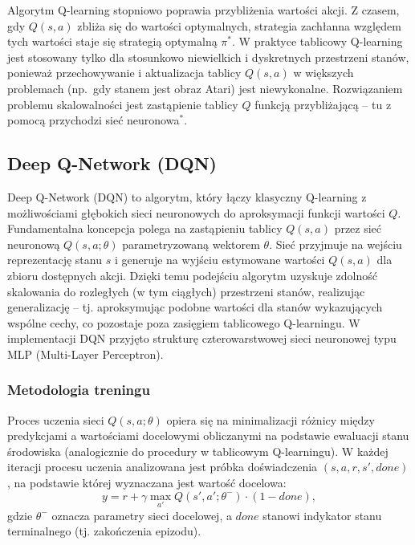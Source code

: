 \documentclass[a4paper,12pt]{article}
\begin{document}
Algorytm Q-learning stopniowo poprawia przybliżenia wartości akcji. Z czasem, gdy \(Q(s,a)\) zbliża się do wartości optymalnych, strategia zachłanna względem tych wartości staje się strategią optymalną \(\pi^*\). W praktyce tablicowy Q-learning jest stosowany tylko dla stosunkowo niewielkich i dyskretnych przestrzeni stanów, ponieważ przechowywanie i aktualizacja tablicy \(Q(s,a)\) w większych problemach (np.\ gdy stanem jest obraz Atari) jest niewykonalne. Rozwiązaniem problemu skalowalności jest zastąpienie tablicy \(Q\) funkcją przybliżającą – tu z pomocą przychodzi sieć neuronowa\(^*\).

\subsection{Deep Q-Network (DQN)}

Deep Q-Network (DQN) to algorytm, który łączy klasyczny Q-learning z możliwościami głębokich sieci neuronowych do aproksymacji funkcji wartości \(Q\). Fundamentalna koncepcja polega na zastąpieniu tablicy \(Q(s,a)\) przez sieć neuronową \(Q(s,a;\theta)\) parametryzowaną wektorem \(\theta\). Sieć przyjmuje na wejściu reprezentację stanu \(s\) i generuje na wyjściu estymowane wartości \(Q(s,a)\) dla zbioru dostępnych akcji. Dzięki temu podejściu algorytm uzyskuje zdolność skalowania do rozległych (w tym ciągłych) przestrzeni stanów, realizując generalizację – tj. aproksymując podobne wartości dla stanów wykazujących wspólne cechy, co pozostaje poza zasięgiem tablicowego Q-learningu.
W implementacji DQN przyjęto strukturę czterowarstwowej sieci neuronowej typu MLP (Multi-Layer Perceptron).

\subsubsection{Metodologia treningu}

Proces uczenia sieci \(Q(s,a;\theta)\) opiera się na minimalizacji różnicy między predykcjami a wartościami docelowymi obliczanymi na podstawie ewaluacji stanu środowiska (analogicznie do procedury w tablicowym Q-learningu). W każdej iteracji procesu uczenia analizowana jest próbka doświadczenia \((s,a,r,s',done)\), na podstawie której wyznaczana jest wartość docelowa:
\begin{equation}
y = r + \gamma \max_{a'} Q(s',a';\theta^-) \cdot (1 - done),
\end{equation}
gdzie \(\theta^-\) oznacza parametry sieci docelowej, a \(done\) stanowi indykator stanu terminalnego (tj. zakończenia epizodu). 
\end{document}
